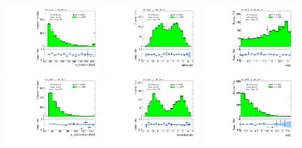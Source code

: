 \clearpage

\begin{figure}[tp]
  \centering
  \includegraphics[width=0.32\textwidth]{figures/analysis/vbf-MCXSR/jet-1-pt}
  \includegraphics[width=0.32\textwidth]{figures/analysis/vbf-MCXSR/jet-1-eta}
  \includegraphics[width=0.32\textwidth]{figures/analysis/vbf-MCXSR/jets-dphi} \\
  \includegraphics[width=0.32\textwidth]{figures/analysis/vbf-MCXSR/jet-2-pt}
  \includegraphics[width=0.32\textwidth]{figures/analysis/vbf-MCXSR/jet-2-eta}
  \includegraphics[width=0.32\textwidth]{figures/analysis/vbf-MCXSR/jets-deta} \\

\end{figure}
